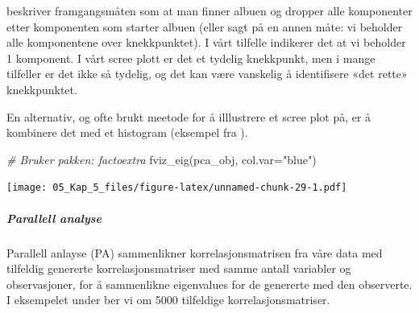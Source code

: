 \documentclass[
]{article}
\newenvironment{Shaded}{\begin{snugshade}}{\end{snugshade}}
\newcommand{\AttributeTok}[1]{\textcolor[rgb]{0.77,0.63,0.00}{#1}}
\newcommand{\CommentTok}[1]{\textcolor[rgb]{0.56,0.35,0.01}{\textit{#1}}}
\newcommand{\FunctionTok}[1]{\textcolor[rgb]{0.00,0.00,0.00}{#1}}
\newcommand{\NormalTok}[1]{#1}
\newcommand{\StringTok}[1]{\textcolor[rgb]{0.31,0.60,0.02}{#1}}
\begin{document}
\citet{cattellScreeTestNumber1966} beskriver framgangsmåten som at man finner albuen og dropper alle komponenter etter komponenten som starter albuen (eller sagt på en annen måte: vi beholder alle komponentene over knekkpunktet). I vårt tilfelle indikerer det at vi beholder 1 komponent. I vårt scree plott er det et tydelig knekkpunkt, men i mange tilfeller er det ikke så tydelig, og det kan være vanskelig å identifisere «det rette» knekkpunktet.

En alternativ, og ofte brukt meetode for å illlustrere et scree plot på, er å kombinere det med et histogram (eksempel fra \citet{szczesnaPrincipalComponentAnalysis2022}).

\begin{Shaded}
\begin{Highlighting}[]
\CommentTok{\# Bruker pakken: factoextra}
\FunctionTok{fviz\_eig}\NormalTok{(pca\_obj, }\AttributeTok{col.var=}\StringTok{"blue"}\NormalTok{)}
\end{Highlighting}
\end{Shaded}

\texttt{[image: 05\_Kap\_5\_files/figure-latex/unnamed-chunk-29-1.pdf]}

\hypertarget{parallell-analyse}{%
\subparagraph{Parallell analyse}\label{parallell-analyse}}

Parallell anlayse (PA) \citep{hornRationaleTestNumber1965} sammenlikner korrelasjonsmatrisen fra våre data med tilfeldig genererte korrelasjonsmatriser med samme antall variabler og observasjoner, for å sammenlikne eigenvalues for de genererte med den observerte. I eksempelet under ber vi om 5000 tilfeldige korrelasjonsmatriser.
\end{document}
